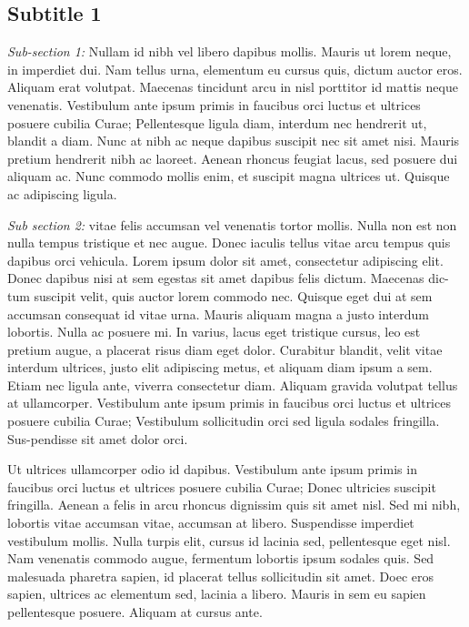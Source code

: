 \documentclass[colTwo]{IIR}
\theoremstyle{definition}
\begin{document}
\subsection{Subtitle 1}
\textit{Sub-section 1:} Nullam id nibh vel libero dapibus mollis. Mauris ut lorem neque, in imperdiet dui. Nam tellus urna, elementum eu cursus quis, dictum auctor eros. Aliquam erat volutpat. Maecenas tincidunt arcu in nisl porttitor id mattis neque venenatis. Vestibulum ante ipsum primis in faucibus orci luctus et ultrices posuere cubilia Curae; Pellentesque ligula diam, interdum nec hendrerit ut, blandit a diam. Nunc at nibh ac neque dapibus suscipit nec sit amet nisi. Mauris pretium hendrerit nibh ac laoreet. Aenean rhoncus feugiat lacus, sed posuere dui aliquam ac. Nunc commodo mollis enim, et suscipit magna ultrices ut. Quisque ac adipiscing ligula.

\textit{Sub section 2:} vitae felis accumsan vel venenatis tortor mollis. Nulla non est non nulla tempus tristique et nec augue. Donec iaculis tellus vitae arcu tempus quis dapibus orci vehicula. Lorem ipsum dolor sit amet, consectetur adipiscing elit. Donec dapibus nisi at sem egestas sit amet dapibus felis dictum. Maecenas dic-tum suscipit velit, quis auctor lorem commodo nec. Quisque eget dui at sem accumsan consequat id vitae urna. Mauris aliquam magna a justo interdum lobortis. Nulla ac posuere mi. In varius, lacus eget tristique cursus, leo est pretium augue, a placerat risus diam eget dolor. Curabitur blandit, velit vitae interdum ultrices, justo elit adipiscing metus, et aliquam diam ipsum a sem. Etiam nec ligula ante, viverra consectetur diam. Aliquam gravida volutpat tellus at ullamcorper. Vestibulum ante ipsum primis in faucibus orci luctus et ultrices posuere cubilia Curae; Vestibulum sollicitudin orci sed ligula sodales fringilla. Sus-pendisse sit amet dolor orci.

Ut ultrices ullamcorper odio id dapibus. Vestibulum ante ipsum primis in faucibus orci luctus et ultrices posuere cubilia Curae; Donec ultricies suscipit fringilla. Aenean a felis in arcu rhoncus dignissim quis sit amet nisl. Sed mi nibh, lobortis vitae accumsan vitae, accumsan at libero. Suspendisse imperdiet vestibulum mollis. Nulla turpis elit, cursus id lacinia sed, pellentesque eget nisl. Nam venenatis commodo augue, fermentum lobortis ipsum sodales quis. Sed malesuada pharetra sapien, id placerat tellus sollicitudin sit amet. Doec eros sapien, ultrices ac elementum sed, lacinia a libero. Mauris in sem eu sapien pellentesque posuere. Aliquam at cursus ante.
\end{document}
